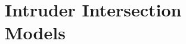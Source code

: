 \cleardoublepage

\chapter[Intruder Intersection Models]{Intruder Intersection\\ Models}\label{app:IntruderProbabilisticModels}

